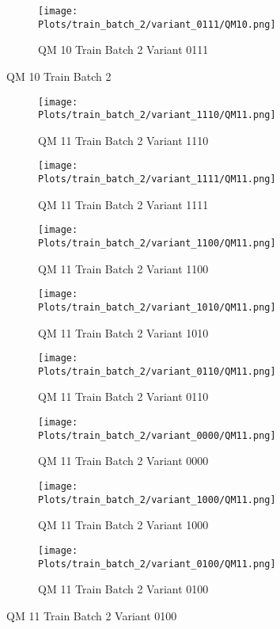 \documentclass{DissertateFigs}
\begin{document}
\begin{figure}[t!]
\medskip

    \begin{subfigure}{0.47\textwidth}
    \texttt{[image: Plots/train\_batch\_2/variant\_0111/QM10.png]}
    \caption{QM 10 Train Batch 2 Variant 0111}
    \end{subfigure}
\caption{QM 10 Train Batch 2}
    \end{figure}
\clearpage
\begin{figure}[t!]
    \begin{subfigure}{0.47\textwidth}
    \texttt{[image: Plots/train\_batch\_2/variant\_1110/QM11.png]}
    \caption{QM 11 Train Batch 2 Variant 1110}
    \end{subfigure}
    \begin{subfigure}{0.47\textwidth}
    \texttt{[image: Plots/train\_batch\_2/variant\_1111/QM11.png]}
    \caption{QM 11 Train Batch 2 Variant 1111}
    \end{subfigure}

\medskip

    \begin{subfigure}{0.47\textwidth}
    \texttt{[image: Plots/train\_batch\_2/variant\_1100/QM11.png]}
    \caption{QM 11 Train Batch 2 Variant 1100}
    \end{subfigure}
    \begin{subfigure}{0.47\textwidth}
    \texttt{[image: Plots/train\_batch\_2/variant\_1010/QM11.png]}
    \caption{QM 11 Train Batch 2 Variant 1010}
    \end{subfigure}

\medskip

    \begin{subfigure}{0.47\textwidth}
    \texttt{[image: Plots/train\_batch\_2/variant\_0110/QM11.png]}
    \caption{QM 11 Train Batch 2 Variant 0110}
    \end{subfigure}
    \begin{subfigure}{0.47\textwidth}
    \texttt{[image: Plots/train\_batch\_2/variant\_0000/QM11.png]}
    \caption{QM 11 Train Batch 2 Variant 0000}
    \end{subfigure}

\medskip

    \begin{subfigure}{0.47\textwidth}
    \texttt{[image: Plots/train\_batch\_2/variant\_1000/QM11.png]}
    \caption{QM 11 Train Batch 2 Variant 1000}
    \end{subfigure}
    \begin{subfigure}{0.47\textwidth}
    \texttt{[image: Plots/train\_batch\_2/variant\_0100/QM11.png]}
    \caption{QM 11 Train Batch 2 Variant 0100}
    \end{subfigure}


\end{figure}
\end{document}
